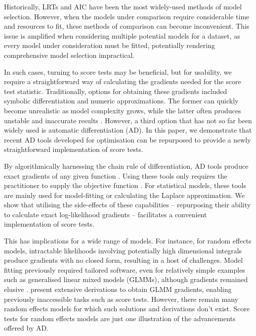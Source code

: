 \documentclass{article}
\begin{document}
Historically, LRTs and AIC have been the most widely-used methods
of model selection. However, when the models under comparison require
considerable time and resources to fit, these methods of comparison can
become inconvenient. This issue is amplified when considering
multiple potential models for a dataset, as every model under
consideration must be fitted, potentially rendering comprehensive
model selection impractical.

In such cases, turning to score tests may be
beneficial, but for usability, we require a straightforward way of
calculating the gradients needed for the score test
statistic. Traditionally, options for obtaining these gradients
included symbolic differentiation and numeric approximations. The former
can quickly become unrealistic as model complexity grows, while the
latter often produces unstable and inaccurate
results \parencite{ADMBpaper}. However, a third option that has not so
far been widely used is automatic differentiation (AD). In this paper,
we demonstrate that recent AD tools developed for optimisation can be
repurposed to provide a newly straightforward implementation of score tests. 

By algorithmically harnessing the chain rule of differentiation, AD tools produce exact
gradients of any given function \parencite{ADMBpaper}. Using these
tools only requires the practitioner to supply the objective function 
\parencite{TMBpaper}. For statistical models, these tools are 
mainly used for model-fitting or calculating 
the Laplace approximation. We show that utilising the side-effects of these
capabilities -- repurposing their ability to calculate
exact log-likelihood gradients -- facilitates a
convenient implementation of score tests.

This has implications for a wide range of models. For instance, for
random effects models, intractable
likelihoods involving potentially high 
dimensional integrals produce gradients with no closed form, resulting in
a host of challenges. Model fitting previously required tailored
software, even for relatively simple examples such as
generalised linear mixed models (GLMMs), although gradients remained
elusive \parencite{lme4-pkg}. \textcite{wang2022} present extensive derivations
to obtain GLMM gradients, enabling previously
inaccessible tasks such as score tests.
However, there remain many random effects 
models for which such solutions and derivations don't exist. Score
tests for random effects models are just one illustration of the  
advancements offered by AD. 
\end{document}
